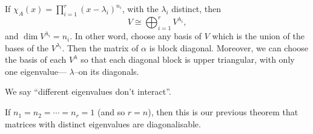 \begin{theorem}
	If $\chi_A(x)=\prod_{i=1}^r \left( x-\lambda_i \right)^{n_i}$, with the $\lambda_i$ distinct, then 
	\begin{equation*}
		V \cong \bigoplus_{i=1}^r  V^{\lambda_i},
	\end{equation*}
	and $\dim V^{\lambda_i}=n_i$. In other word, choose any basis of $V$ which is the union of the bases of the $V^{\lambda_i}$. Then the matrix of $\alpha$ is block diagonal. Moreover, we can choose the basis of each $V^\lambda$ so that each diagonal block is upper triangular, with only one eigenvalue--- $\lambda$--on its diagonals.
	
	We say ``different eigenvalues don't interact''.
\end{theorem}
\vspace{3pt}
\begin{remark}
	If $n_1=n_2=\cdots=n_r=1$ (and so $r=n$), then this is our previous theorem that matrices with distinct eigenvalues are diagonalisable.
\end{remark}

